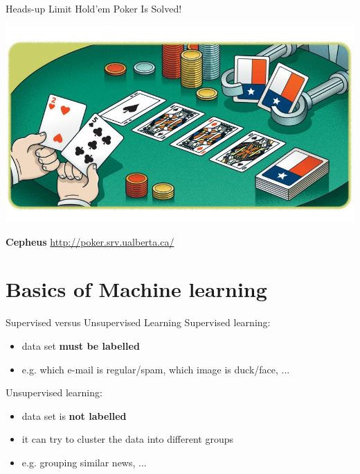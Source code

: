 \documentclass{beamer}
\begin{document}
  {
    \begin{frame}{Heads-up Limit Hold’em Poker Is Solved!}
      \pause
      \begin{center}
        \includegraphics[width=\textwidth, keepaspectratio]{../img/limit_holdem_poker.jpg}

        \textbf{Cepheus} \url{http://poker.srv.ualberta.ca/}
      \end{center}
    \end{frame}
  }


  \section{Basics of Machine learning}

  \begin{frame}{Supervised versus Unsupervised Learning}
    Supervised learning:
    \pause
    \begin{itemize}[<+- | alert@+>]
      \item data set \textbf{must be labelled}
      \item e.g. which e-mail is regular/spam, which image is duck/face, ...
    \end{itemize}
    \pause

    Unsupervised learning:
    \pause
    \begin{itemize}[<+- | alert@+>]
      \item data set is \textbf{not labelled}
      \item it can try to cluster the data into different groups
      \item e.g. grouping similar news, ...
    \end{itemize}
  \end{frame}
\end{document}
